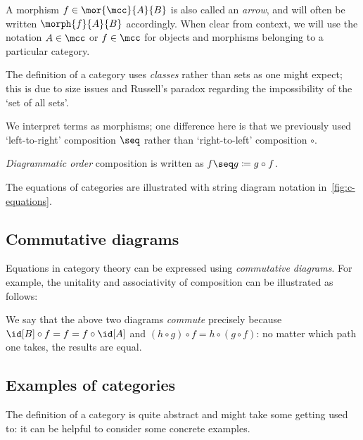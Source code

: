 A morphism \(f \in \mor{\mcc}{A}{B}\) is also called an \emph{arrow}, and will
often be written \(\morph{f}{A}{B}\) accordingly.
When clear from context, we will use the notation \(A \in \mcc\) or
\(f \in \mcc\) for objects and morphisms belonging to a particular category.

\begin{remark}
    The definition of a category uses \emph{classes} rather than sets as one
    might expect; this is due to size issues and Russell's paradox regarding
    the impossibility of the `set of all sets'.
\end{remark}

We interpret terms as morphisms; one difference here is that we previously used
`left-to-right' composition \(\seq\) rather than `right-to-left' composition
\(\circ\).

\begin{notation}
    \emph{Diagrammatic order} composition is written as
    \(f \seq g \coloneqq g \circ f\).
\end{notation}



The equations of categories are illustrated with string diagram notation
in~\cref{fig:c-equations}.

\subsection{Commutative diagrams}

Equations in category theory can be expressed using \emph{commutative diagrams}.
For example, the unitality and associativity of composition can be illustrated
as follows:

\begin{center}
    
    \quad
    
\end{center}

We say that the above two diagrams \emph{commute} precisely because \(
\id[B] \circ f = f = f \circ \id[A]
\) and \((h \circ g) \circ f = h \circ (g \circ f)\): no matter which path one
takes, the results are equal.

\subsection{Examples of categories}

The definition of a category is quite abstract and might take some getting used
to: it can be helpful to consider some concrete examples.

